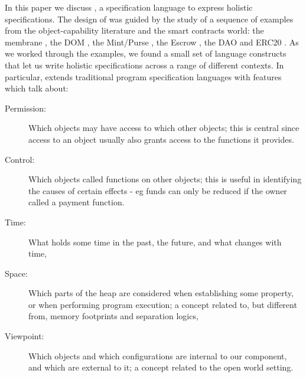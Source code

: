 In this paper we discuss \Chainmail, a specification language to
express holistic specifications.
The design of \Chainmail was guided by the study of a sequence of
examples from the object-capability literature and the smart contracts world: the
membrane \cite{membranesJavascript}, the DOM \cite{dd,ddd}, the Mint/Purse \cite{MillerPhD}, the Escrow \cite{proxiesECOOP2013}, the DAO \cite{Dao,DaoBug} and
ERC20 \cite{ERC20}.  As we worked through the
examples, we found a small set of language constructs that let us
write holistic specifications across a range of different contexts.
%
In particular, \Chainmail extends 
traditional program specification languages \cite{Leavens-etal07,Meyer92} with features which talk about:
%
\begin{description}
\item[Permission: ] 
Which objects may have access to which other objects; 
this is central since access to an object usually also grants access to the functions it provides.
%
\item[Control: ]
Which objects called functions on other objects; this
 is useful in identifying the causes of certain effects - eg 
funds can only be reduced if the owner called a payment function.
%
%
\item[Time: ]
What holds some time in  the past, the future, and what changes with time,
\item[Space: ]
Which parts of the heap are considered when establishing some property, or when 
performing program execution; a concept
related to, but different from, memory footprints and separation logics,
\item[Viewpoint: ]
Which objects and which configurations are internal to our component, and which  are
external to it;
a concept related to the open world setting.
\end{description}

